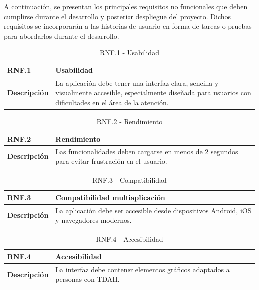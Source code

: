 A continuación, se presentan los principales requisitos no funcionales que deben cumplirse durante el desarrollo y posterior despliegue del proyecto.
Dichos requisitos se incorporarán a las historias de usuario en forma de tareas o pruebas para abordarlos durante el desarrollo.

\begin{table}[H]
\centering
\begin{tabularx}{\textwidth}{|X|p{}|}
\hline
\textbf{RNF.1} & Usabilidad \\
\hline
\textbf{Descripción} & La aplicación debe tener una interfaz clara, sencilla y visualmente accesible, especialmente diseñada para usuarios con dificultades en el área de la atención. \\
\hline
\end{tabularx}
\caption{RNF.1 - Usabilidad}
\end{table}

\begin{table}[H]
\centering
\begin{tabularx}{\textwidth}{|X|p{}|}
\hline
\textbf{RNF.2} & Rendimiento \\
\hline
\textbf{Descripción} & Las funcionalidades deben cargarse en menos de 2 segundos para evitar frustración en el usuario. \\
\hline
\end{tabularx}
\caption{RNF.2 - Rendimiento}
\end{table}

\begin{table}[H]
\centering
\begin{tabularx}{\textwidth}{|X|p{}|}
\hline
\textbf{RNF.3} & Compatibilidad multiaplicación \\
\hline
\textbf{Descripción} & La aplicación debe ser accesible desde dispositivos Android, iOS y navegadores modernos. \\
\hline
\end{tabularx}
\caption{RNF.3 - Compatibilidad}
\end{table}

\begin{table}[H]
\centering
\begin{tabularx}{\textwidth}{|X|p{}|}
\hline
\textbf{RNF.4} & Accesibilidad \\
\hline
\textbf{Descripción} & La interfaz debe contener elementos gráficos adaptados a personas con TDAH. \\
\hline
\end{tabularx}
\caption{RNF.4 - Accesibilidad}
\end{table}

